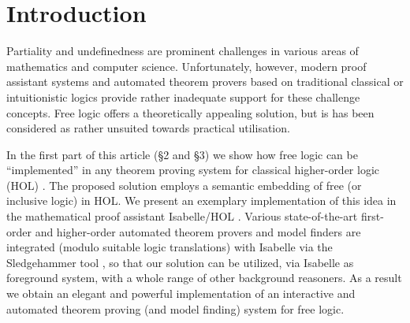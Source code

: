 \section{Introduction}
\label{intro}
Partiality and undefinedness are prominent challenges in various areas
of mathematics and computer science.  Unfortunately, however, modern
proof assistant systems and automated theorem provers based on
traditional classical or intuitionistic logics provide rather
inadequate support for these challenge concepts.  Free logic offers a
theoretically appealing solution, but is has been considered as rather
unsuited towards practical utilisation.


In the first part of this article (\S2 and \S3) we show how free logic can be
``implemented'' in any theorem proving system for classical
higher-order logic (HOL) \cite{B5}. The proposed solution employs a
semantic embedding of free (or inclusive logic) in HOL. We present an
exemplary implementation of this idea in the mathematical proof
assistant Isabelle/HOL \cite{NPW02}. Various state-of-the-art
first-order and higher-order automated theorem provers and model
finders are integrated (modulo suitable logic translations) with
Isabelle via the Sledgehammer tool \cite{Sledgehammer}, so that our
solution can be utilized, via Isabelle as foreground system, with a
whole range of other background reasoners. As a result we obtain an
elegant and powerful implementation of an interactive and automated
theorem proving (and model finding) system for free logic.





 
